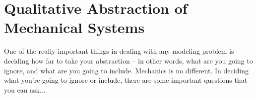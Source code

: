 \section{Qualitative Abstraction of Mechanical Systems}
One of the really important things in dealing with any modeling problem is deciding how far to take your abstraction -- in other words, what are you going to ignore, and what are you going to include.  Mechanics is no different.   In deciding what you're going to ignore or include, there are some important questions that you can ask...
% 
%

